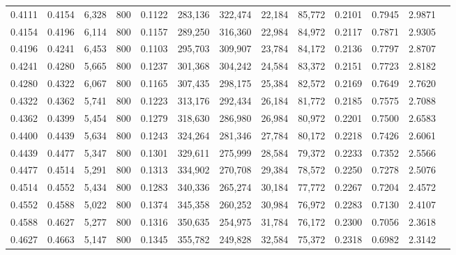 \begin{tabular}{rrrrrrrrrrrrr}
0.4111 & 0.4154 &  6,328 & 800 &                                     0.1122 & 283,136 & 322,474 &  22,184 &  85,772 & 0.2101 & 0.7945 & 2.9871 \\
0.4154 & 0.4196 &  6,114 & 800 &                                     0.1157 & 289,250 & 316,360 &  22,984 &  84,972 & 0.2117 & 0.7871 & 2.9305 \\
0.4196 & 0.4241 &  6,453 & 800 &                                     0.1103 & 295,703 & 309,907 &  23,784 &  84,172 & 0.2136 & 0.7797 & 2.8707 \\
0.4241 & 0.4280 &  5,665 & 800 &                                     0.1237 & 301,368 & 304,242 &  24,584 &  83,372 & 0.2151 & 0.7723 & 2.8182 \\
0.4280 & 0.4322 &  6,067 & 800 &                                     0.1165 & 307,435 & 298,175 &  25,384 &  82,572 & 0.2169 & 0.7649 & 2.7620 \\
0.4322 & 0.4362 &  5,741 & 800 &                                     0.1223 & 313,176 & 292,434 &  26,184 &  81,772 & 0.2185 & 0.7575 & 2.7088 \\
0.4362 & 0.4399 &  5,454 & 800 &                                     0.1279 & 318,630 & 286,980 &  26,984 &  80,972 & 0.2201 & 0.7500 & 2.6583 \\
0.4400 & 0.4439 &  5,634 & 800 &                                     0.1243 & 324,264 & 281,346 &  27,784 &  80,172 & 0.2218 & 0.7426 & 2.6061 \\
0.4439 & 0.4477 &  5,347 & 800 &                                     0.1301 & 329,611 & 275,999 &  28,584 &  79,372 & 0.2233 & 0.7352 & 2.5566 \\
0.4477 & 0.4514 &  5,291 & 800 &                                     0.1313 & 334,902 & 270,708 &  29,384 &  78,572 & 0.2250 & 0.7278 & 2.5076 \\
0.4514 & 0.4552 &  5,434 & 800 &                                     0.1283 & 340,336 & 265,274 &  30,184 &  77,772 & 0.2267 & 0.7204 & 2.4572 \\
0.4552 & 0.4588 &  5,022 & 800 &                                     0.1374 & 345,358 & 260,252 &  30,984 &  76,972 & 0.2283 & 0.7130 & 2.4107 \\
0.4588 & 0.4627 &  5,277 & 800 &                                     0.1316 & 350,635 & 254,975 &  31,784 &  76,172 & 0.2300 & 0.7056 & 2.3618 \\
0.4627 & 0.4663 &  5,147 & 800 &                                     0.1345 & 355,782 & 249,828 &  32,584 &  75,372 & 0.2318 & 0.6982 & 2.3142 \\

\end{tabular}
